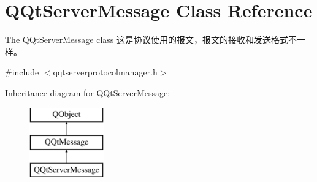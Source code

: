 \hypertarget{class_q_qt_server_message}{}\section{Q\+Qt\+Server\+Message Class Reference}
\label{class_q_qt_server_message}


The \mbox{\hyperlink{class_q_qt_server_message}{Q\+Qt\+Server\+Message}} class 这是协议使用的报文，报文的接收和发送格式不一样。  




{\ttfamily \#include $<$qqtserverprotocolmanager.\+h$>$}

Inheritance diagram for Q\+Qt\+Server\+Message\+:\begin{figure}[H]
\begin{center}
\leavevmode
\includegraphics[height=3.000000cm]{class_q_qt_server_message}
\end{center}
\end{figure}

